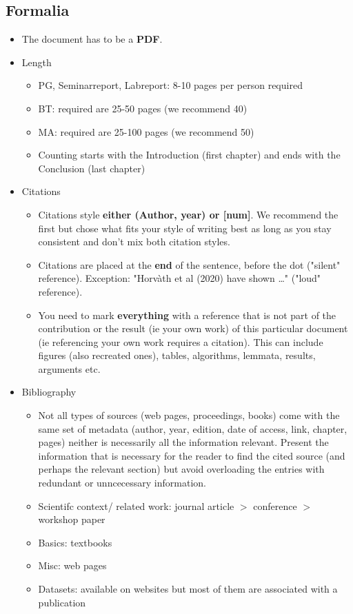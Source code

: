 \documentclass[nodate]{proc}
\begin{document}
\subsection{Formalia}
\begin{itemize}

	\item The document has to be a \textbf{PDF}.

	\item Length
	\begin{itemize}
		\item PG, Seminarreport, Labreport: 8-10 pages per person required
		\item BT: required are 25-50 pages (we recommend 40)
		\item MA: required are 25-100 pages (we recommend 50)
		\item Counting starts with the Introduction (first chapter) and ends with the Conclusion (last chapter)
	\end{itemize}

	\item Citations
	\begin{itemize}
		\item Citations style \textbf{either (Author, year) or [num]}. We recommend the first but chose what fits your style of writing best as long as you stay consistent and don't mix both citation styles.
		\item Citations are placed at the \textbf{end} of the sentence, before the dot ("silent" reference). Exception: "Horvàth et al (2020) have shown \dots" ("loud" reference).
		\item You need to mark \textbf{everything} with a reference that is not part of the contribution or the result (ie your own work) of this particular document (ie referencing your own work requires a citation). This can include figures (also recreated ones), tables, algorithms, lemmata, results, arguments etc.
	\end{itemize}

	\item Bibliography \label{general_bib}
	\begin{itemize}
		\item Not all types of sources (web pages, proceedings, books) come with the same set of metadata (author, year, edition, date of access, link, chapter, pages) neither is necessarily all the information relevant. Present the information that is necessary for the reader to find the cited source (and perhaps the relevant section) but avoid overloading the entries with redundant or unncecessary information.
		\item Scientifc context/ related work: journal article $>$ conference $>$ workshop paper
		\item Basics: textbooks
		\item Misc: web pages
		\item Datasets: available on websites but most of them are associated with a publication 
	\end{itemize}

\end{itemize}
\end{document}
